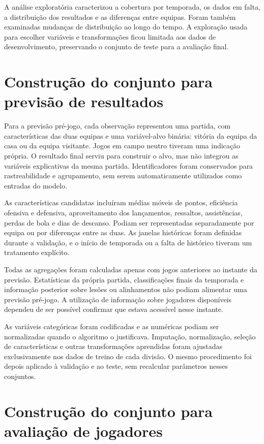 A análise exploratória caracterizou a cobertura por temporada, os dados
em falta, a distribuição dos resultados e as diferenças entre equipas.
Foram também examinadas mudanças de distribuição ao longo do tempo.
A exploração usada para escolher variáveis e transformações ficou
limitada aos dados de desenvolvimento, preservando o conjunto de teste
para a avaliação final.

\section{Construção do conjunto para previsão de resultados}

Para a previsão pré-jogo, cada observação representou uma partida,
com características das duas equipas e uma variável-alvo binária:
vitória da equipa da casa ou da equipa visitante. Jogos em campo neutro
tiveram uma indicação própria. O resultado final serviu para construir
o alvo, mas não integrou as variáveis explicativas da mesma partida.
Identificadores foram conservados para rastreabilidade e agrupamento,
sem serem automaticamente utilizados como entradas do modelo.

As características candidatas incluíram médias móveis de pontos,
eficiência ofensiva e defensiva, aproveitamento dos lançamentos,
ressaltos, assistências, perdas de bola e dias de descanso. Podiam ser
representadas separadamente por equipa ou por diferenças entre as duas.
As janelas históricas foram definidas durante a validação, e o início
de temporada ou a falta de histórico tiveram um tratamento explícito.

Todas as agregações foram calculadas apenas com jogos anteriores ao
instante da previsão. Estatísticas da própria partida, classificações
finais da temporada e informação posterior sobre lesões ou alinhamentos
não podiam alimentar uma previsão pré-jogo. A utilização de informação
sobre jogadores disponíveis dependeu de ser possível confirmar que
estava acessível nesse instante.

As variáveis categóricas foram codificadas e as numéricas podiam ser
normalizadas quando o algoritmo o justificava. Imputação, normalização,
seleção de características e outras transformações aprendidas foram
ajustadas exclusivamente nos dados de treino de cada divisão. O mesmo
procedimento foi depois aplicado à validação e ao teste, sem recalcular
parâmetros nesses conjuntos.

\section{Construção do conjunto para avaliação de jogadores}

